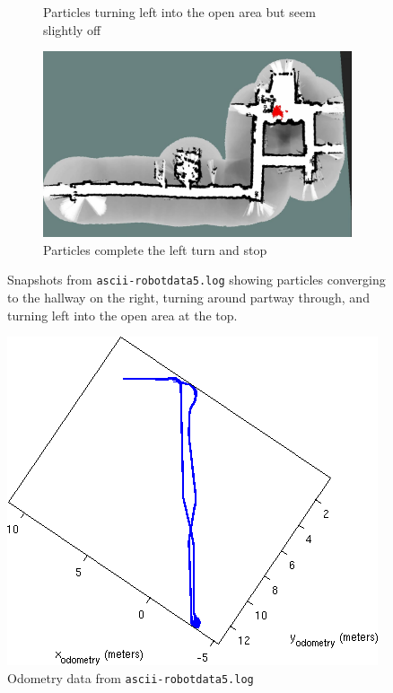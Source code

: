 \begin{figure}
\begin{subfigure}[b]{0.49\textwidth}
\caption{Particles turning left into the open area but seem slightly off}
\label{fig:Screenshot-video_log5-10k_goodenough-3}
\end{subfigure}
\begin{subfigure}[b]{0.49\textwidth}
\includegraphics[width=\linewidth]{figures/Screenshot-video_log5-10k_goodenough-4}
\caption{Particles complete the left turn and stop}
\label{fig:Screenshot-video_log5-10k_goodenough-4}
\end{subfigure}
\caption{Snapshots from \texttt{ascii-robotdata5.log} showing particles converging to the hallway on the right, turning around partway through, and turning left into the open area at the top.
\label{fig:Screenshot-video_log5-10k_goodenough}}
\end{figure}

\begin{figure}
\centering
\includegraphics[width=0.45\linewidth]{figures/log5odom}
\caption{Odometry data from \texttt{ascii-robotdata5.log}}
\label{fig:log5odom}
\end{figure}
